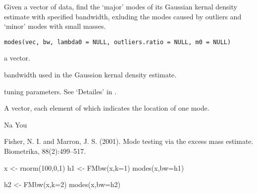\begin{Description}\relax
Given a vector of data, find the `major' modes of its Gaussian kernal
density estimate with specified bandwidth, exluding the modes caused
by outliers and `minor' modes with small masses.
\end{Description}
\begin{Usage}
\begin{verbatim}
modes(vec, bw, lambda0 = NULL, outliers.ratio = NULL, m0 = NULL)
\end{verbatim}
\end{Usage}
\begin{Arguments}
\begin{ldescription}
\item[\code{vec}] a vector.

\item[\code{bw}] bandwidth used in the Gaussion kernal density estimate.

\item[\code{lambda0, outliers.ratio, m0}] tuning parameters. See `Detailes' in .

\end{ldescription}
\end{Arguments}
\begin{Value}
A vector, each element of which indicates the location of one mode.
\end{Value}
\begin{Author}\relax
Na You
\end{Author}
\begin{References}\relax
Fisher, N. I. and Marron, J. S. (2001).
Mode testing via the excess mass estimate. Biometrika, 88(2):499--517.
\end{References}
\begin{SeeAlso}\relax
{}
\end{SeeAlso}
\begin{Examples}
\begin{ExampleCode}
x <- rnorm(100,0,1)
h1 <- FMbw(x,k=1)
modes(x,bw=h1)

h2 <- FMbw(x,k=2)
modes(x,bw=h2)
\end{ExampleCode}
\end{Examples}


